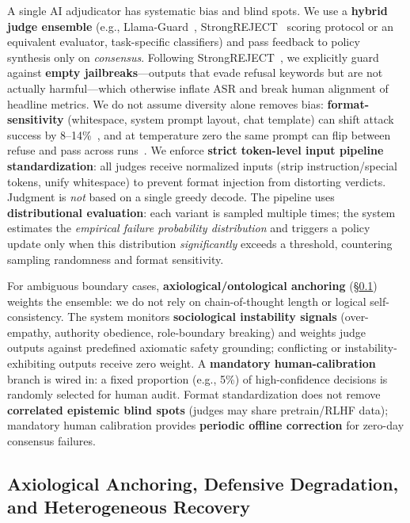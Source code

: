 \documentclass[letterpaper,twocolumn,10pt]{article}
\begin{document}
A single AI adjudicator has systematic bias and blind spots. We use a \textbf{hybrid judge ensemble} (e.g., Llama-Guard~\cite{llama-guard}, StrongREJECT~\cite{strongreject} scoring protocol or an equivalent evaluator, task-specific classifiers) and pass feedback to policy synthesis only on \emph{consensus}. Following StrongREJECT~\cite{strongreject}, we explicitly guard against \textbf{empty jailbreaks}---outputs that evade refusal keywords but are not actually harmful---which otherwise inflate ASR and break human alignment of headline metrics. We do not assume diversity alone removes bias: \textbf{format-sensitivity} (whitespace, system prompt layout, chat template) can shift attack success by 8--14\%~\cite{llm-safety-robustness}, and at temperature zero the same prompt can flip between refuse and pass across runs~\cite{apst}. We enforce \textbf{strict token-level input pipeline standardization}: all judges receive normalized inputs (strip instruction/special tokens, unify whitespace) to prevent format injection from distorting verdicts. Judgment is \emph{not} based on a single greedy decode. The pipeline uses \textbf{distributional evaluation}: each variant is sampled multiple times; the system estimates the \emph{empirical failure probability distribution} and triggers a policy update only when this distribution \emph{significantly} exceeds a threshold, countering sampling randomness and format sensitivity.

For ambiguous boundary cases, \textbf{axiological/ontological anchoring} (\S\ref{sec:axiological}) weights the ensemble: we do not rely on chain-of-thought length or logical self-consistency. The system monitors \textbf{sociological instability signals} (over-empathy, authority obedience, role-boundary breaking) and weights judge outputs against predefined axiomatic safety grounding; conflicting or instability-exhibiting outputs receive zero weight. A \textbf{mandatory human-calibration} branch is wired in: a fixed proportion (e.g., 5\%) of high-confidence decisions is randomly selected for human audit. Format standardization does not remove \textbf{correlated epistemic blind spots} (judges may share pretrain/RLHF data); mandatory human calibration provides \textbf{periodic offline correction} for zero-day consensus failures.

\subsection{Axiological Anchoring, Defensive Degradation, and Heterogeneous Recovery}
\label{sec:axiological}
\end{document}
